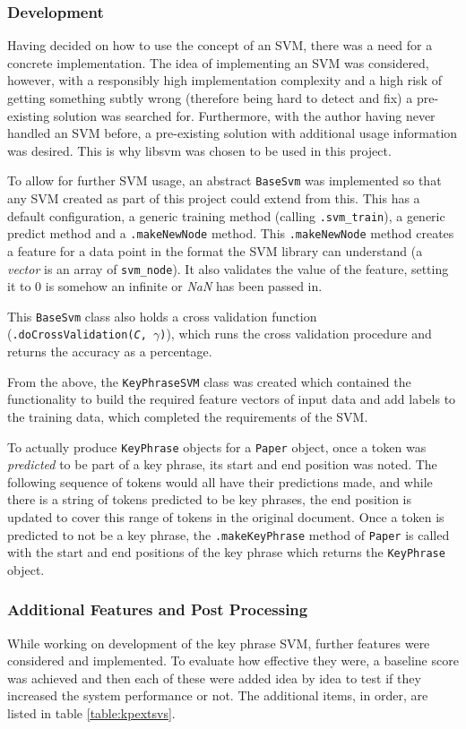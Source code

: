 \subsubsection*{Development}
Having decided on how to use the concept of an SVM, there was a need for a concrete implementation. The idea of implementing an SVM was considered, however, with a responsibly high implementation complexity and a high risk of getting something subtly wrong (therefore being hard to detect and fix) a pre-existing solution was searched for. Furthermore, with the author having never handled an SVM before, a pre-existing solution with additional usage information was desired. This is why libsvm was chosen to be used in this project.

To allow for further SVM usage, an abstract \texttt{BaseSvm} was implemented so that any SVM created as part of this project could extend from this. This has a default configuration, a generic training method (calling \texttt{.svm\_train}), a generic predict method and a \texttt{.makeNewNode} method. This \texttt{.makeNewNode} method creates a feature for a data point in the format the SVM library can understand (a \textit{vector} is an array of \texttt{svm\_node}). It also validates the value of the feature, setting it to 0 is somehow an infinite or \textit{NaN} has been passed in. 

This \texttt{BaseSvm} class also holds a cross validation function (\texttt{.doCrossValidation(\textit{C}, $\gamma$)}), which runs the cross validation procedure and returns the accuracy as a percentage.

From the above, the \texttt{KeyPhraseSVM} class was created which contained the functionality to build the required feature vectors of input data and add labels to the training data, which completed the requirements of the SVM.

To actually produce \texttt{KeyPhrase} objects for a \texttt{Paper} object, once a token was \textit{predicted} to be part of a key phrase, its start and end position was noted. The following sequence of tokens would all have their predictions made, and while there is a string of tokens predicted to be key phrases, the end position is updated to cover this range of tokens in the original document. Once a token is predicted to not be a key phrase, the \texttt{.makeKeyPhrase} method of \texttt{Paper} is called with the start and end positions of the key phrase which returns the \texttt{KeyPhrase} object.

\subsubsection*{Additional Features and Post Processing}
While working on development of the key phrase SVM, further features were considered and implemented. To evaluate how effective they were, a baseline score was achieved and then each of these were added idea by idea to test if they increased the system performance or not. The additional items, in order, are listed in table \ref{table:kpextsvs}. 

